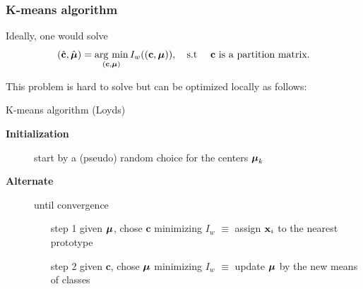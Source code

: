 \documentclass{beamer}\usepackage[]{graphicx}\usepackage[]{color}
\begin{document}
\begin{frame}
  \frametitle{K-means algorithm}
  
  Ideally, one would solve
  \begin{equation*}
    (\hat{\mathbf{c}}, \hat{\boldsymbol{\mu}}) = \mathop{\mathrm{arg\ min}}_{(\mathbf{c}, \boldsymbol{\mu})}  I_w((\mathbf{c}, \boldsymbol{\mu})), \quad \text{s.t \quad $\mathbf{c}$ is a partition matrix}.
  \end{equation*}
  
  This problem is hard to solve but can be optimized locally as follows:

  \vfill
  
  \begin{block}{K-means algorithm (Loyds)}
  \begin{description}
    \item[\textbf{Initialization}] start by a (pseudo) random choice for the centers $\boldsymbol{\mu}_k$
    \item[\textbf{Alternate}] until convergence
      \begin{enumerate}
        \item[step 1] given $\boldsymbol{\mu}$, chose $\mathbf{c}$ minimizing $I_w$ $\equiv$ assign $\mathbf{x}_i$ to the nearest prototype
        \item[step 2] given $\mathbf{c}$, chose $\boldsymbol{\mu}$ minimizing $I_w$ $\equiv$ update $\boldsymbol{\mu}$ by the new means of classes
      \end{enumerate}
    \end{description}
  \end{block}

\end{frame}
\end{document}
